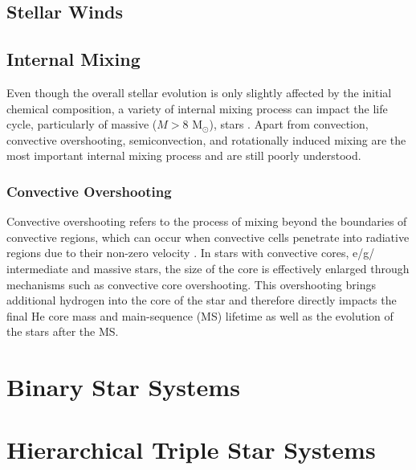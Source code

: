 \subsection{Stellar Winds}



\subsection{Internal Mixing}\label{sub:mixing}

Even though the overall stellar evolution is only slightly affected by the initial chemical composition, a variety of internal mixing process can impact the life cycle, particularly of massive ($M>8$ M$_{\odot}$), stars \citep{langer2012presupernova}. Apart from convection, convective overshooting, semiconvection, and rotationally induced mixing are the most important internal mixing process \citep{schootemeijer2019constraining} and are still poorly understood. 

\subsubsection{Convective Overshooting}

Convective overshooting refers to the process of mixing beyond the boundaries of convective regions, which can occur when convective cells penetrate into radiative regions due to their non-zero velocity \citep{alongi1993evolutionary,brott2011rotating,schootemeijer2019constraining}. In stars with convective cores, e/g/ intermediate and massive stars, the size of the core is effectively enlarged through mechanisms such as convective core overshooting. This overshooting brings additional hydrogen into the core of the star and therefore directly impacts the final He core mass and main-sequence (MS) lifetime as well as the evolution of the stars after the MS.

\section{Binary Star Systems}

\section{Hierarchical Triple Star Systems}



